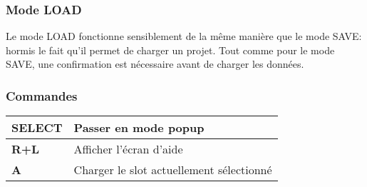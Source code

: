 \subsubsection{Mode LOAD}

Le mode LOAD fonctionne sensiblement de la même manière que le mode SAVE: hormis le fait qu'il permet de charger un projet.
Tout comme pour le mode SAVE, une confirmation est nécessaire avant de charger les données.


\subsubsection{Commandes}
\tablelasttail{\hline}
\begin{supertabular}{|l|p{11cm}|}
    {\bf SELECT} & Passer en mode popup \\
    \hline
    {\bf R+L} & Afficher l'écran d'aide \\
    \hline
    {\bf A} & Charger le slot actuellement sélectionné \\
\end{supertabular}

